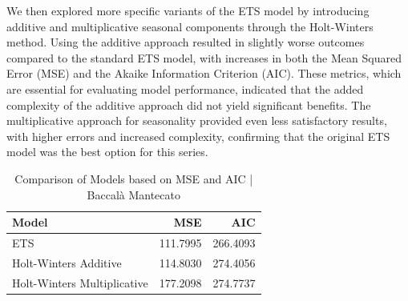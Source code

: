 \documentclass[10pt,twocolumn,letterpaper]{article}
\begin{document}
We then explored more specific variants of the ETS model by introducing additive and multiplicative seasonal components through the Holt-Winters method. Using the additive approach resulted in slightly worse outcomes compared to the standard ETS model, with increases in both the Mean Squared Error (MSE) and the Akaike Information Criterion (AIC). These metrics, which are essential for evaluating model performance, indicated that the added complexity of the additive approach did not yield significant benefits. The multiplicative approach for seasonality provided even less satisfactory results, with higher errors and increased complexity, confirming that the original ETS model was the best option for this series.
\begin{table}[H]
\centering
\begin{tabular}{|l|r|r|}
\hline
\textbf{Model} & \textbf{MSE} & \textbf{AIC} \\
\hline
ETS & 111.7995 & 266.4093 \\
Holt-Winters Additive & 114.8030 & 274.4056 \\
Holt-Winters Multiplicative & 177.2098 & 274.7737 \\
\hline
\end{tabular}
\caption{Comparison of Models based on MSE and AIC | Baccalà Mantecato}
\label{table:model_comparison}
\end{table}
\end{document}
